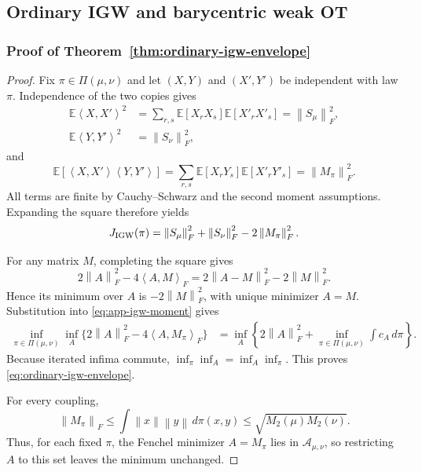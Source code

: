 \documentclass[11pt]{article}
\newcommand{\E}{\mathbb E}
\newcommand{\ip}[2]{\left\langle #1,#2\right\rangle}
\newcommand{\norm}[1]{\left\lVert #1\right\rVert}
\theoremstyle{plain}
\theoremstyle{definition}
\theoremstyle{remark}
\begin{document}
\subsection{Ordinary IGW and barycentric weak OT}

\subsubsection{Proof of Theorem~\ref{thm:ordinary-igw-envelope}}\label{proof:2.1}

\begin{proof}
Fix $\pi\in\Pi(\mu,\nu)$ and let $(X,Y)$ and $(X',Y')$ be independent with
law $\pi$.  Independence of the two copies gives
\begin{align*}
 \E\ip{X}{X'}^2
 &=\sum_{r,s}\E[X_rX_s]\E[X'_rX'_s]=\norm{S_\mu}_F^2,\\
 \E\ip{Y}{Y'}^2&=\norm{S_\nu}_F^2,
\end{align*}
and
\[
 \E[\ip{X}{X'}\ip{Y}{Y'}]
 =\sum_{r,s}\E[X_rY_s]\E[X'_rY'_s]
 =\norm{M_\pi}_F^2.
\]
All terms are finite by Cauchy--Schwarz and the second moment assumptions.
Expanding the square therefore yields
\begin{equation}\label{eq:app-igw-moment}
 J_{\rm IGW}(\pi)
 =\norm{S_\mu}_F^2+\norm{S_\nu}_F^2-2\norm{M_\pi}_F^2.
\end{equation}

For any matrix $M$, completing the square gives
\[
 2\norm A_F^2-4\ip A M_F
 =2\norm{A-M}_F^2-2\norm M_F^2.
\]
Hence its minimum over $A$ is $-2\norm M_F^2$, with unique minimizer $A=M$.
Substitution into \eqref{eq:app-igw-moment} gives
\begin{align*}
 \inf_{\pi\in\Pi(\mu,\nu)}\inf_A
 \{2\norm A_F^2-4\ip A{M_\pi}_F\}
 &=\inf_A\left\{2\norm A_F^2+
   \inf_{\pi\in\Pi(\mu,\nu)}\int c_A\,d\pi\right\}.
\end{align*}
Because iterated infima commute,
$\inf_\pi\inf_A=\inf_A\inf_\pi$. This proves
\eqref{eq:ordinary-igw-envelope}.

For every coupling,
\[
 \norm{M_\pi}_F
 \le\int\norm x\norm y\,d\pi(x,y)
 \le\sqrt{M_2(\mu)M_2(\nu)}.
\]
Thus, for each fixed $\pi$, the Fenchel minimizer $A=M_\pi$ lies in
$\mathcal A_{\mu,\nu}$, so restricting $A$ to this set leaves the minimum
unchanged.


\end{proof}
\end{document}
